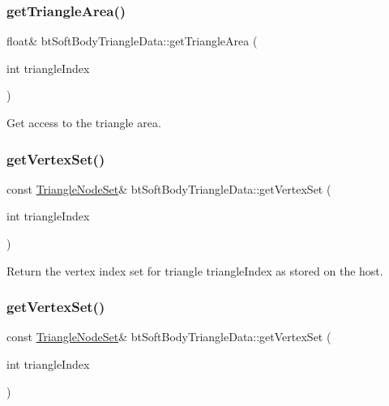 \subsubsection{\texorpdfstring{get\+Triangle\+Area()}{getTriangleArea()}\hspace{0.1cm}{\footnotesize\ttfamily [2/2]}}
{\footnotesize\ttfamily float\& bt\+Soft\+Body\+Triangle\+Data\+::get\+Triangle\+Area (\begin{DoxyParamCaption}\item[{int}]{triangle\+Index }\end{DoxyParamCaption})\hspace{0.3cm}{\ttfamily [inline]}}

Get access to the triangle area. \mbox{\label{classbtSoftBodyTriangleData_a88e1d23b6229d976968fe9ad3335baa5}} 
\subsubsection{\texorpdfstring{get\+Vertex\+Set()}{getVertexSet()}\hspace{0.1cm}{\footnotesize\ttfamily [1/2]}}
{\footnotesize\ttfamily const \hyperlink{classbtSoftBodyTriangleData_1_1TriangleNodeSet}{Triangle\+Node\+Set}\& bt\+Soft\+Body\+Triangle\+Data\+::get\+Vertex\+Set (\begin{DoxyParamCaption}\item[{int}]{triangle\+Index }\end{DoxyParamCaption})\hspace{0.3cm}{\ttfamily [inline]}}

Return the vertex index set for triangle triangle\+Index as stored on the host. \mbox{\label{classbtSoftBodyTriangleData_a88e1d23b6229d976968fe9ad3335baa5}} 
\subsubsection{\texorpdfstring{get\+Vertex\+Set()}{getVertexSet()}\hspace{0.1cm}{\footnotesize\ttfamily [2/2]}}
{\footnotesize\ttfamily const \hyperlink{classbtSoftBodyTriangleData_1_1TriangleNodeSet}{Triangle\+Node\+Set}\& bt\+Soft\+Body\+Triangle\+Data\+::get\+Vertex\+Set (\begin{DoxyParamCaption}\item[{int}]{triangle\+Index }\end{DoxyParamCaption})\hspace{0.3cm}{\ttfamily [inline]}}

